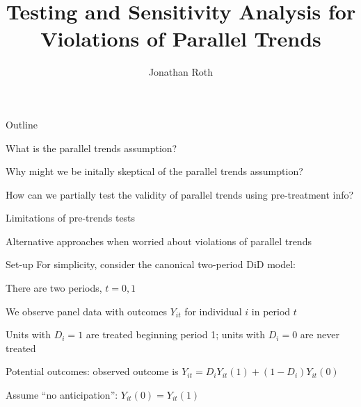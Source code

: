 \documentclass[aspectratio = 169, 13pt]{beamer}
\author{Jonathan Roth}
\title[Pre-trends testing]{Testing and Sensitivity Analysis for Violations of Parallel Trends}
\begin{document}
\maketitle	


\begin{frame}{Outline}
	\begin{wideitemize}
		\item
		What is the parallel trends assumption? 
		
		\item
		Why might we be initally skeptical of the parallel trends assumption? 
		
		\item
		How can we partially test the validity of parallel trends using pre-treatment info? 
		
		\item
		Limitations of pre-trends tests
		
		\item
		Alternative approaches when worried about violations of parallel trends
	\end{wideitemize}
\end{frame}

\begin{frame}{Set-up}
For simplicity, consider the canonical two-period DiD model:
\medskip
\begin{wideitemize}
	\item
	There are two periods, $t=0,1$
	
	\item
	We observe panel data with outcomes $Y_{it}$ for individual $i$ in period $t$
	
	\item
	Units with $D_i=1$ are treated beginning period 1; units with $D_i=0$ are never treated
	
	\item
	Potential outcomes: observed outcome is $Y_{it} = D_i Y_{it}(1) + (1-D_i) Y_{it}(0)$
	
	\item
	Assume ``no anticipation'': $Y_{it}(0) = Y_{it}(1)$
\end{wideitemize}
\end{frame}
\end{document}
